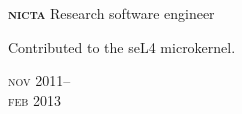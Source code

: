 
\begin{minipage}[t]{\mainboxwidth\textwidth}
\textbf{\textsc{nicta}}\phantom{..} Research software engineer\\
{\small 
Contributed to the seL4 microkernel.
\par}
\end{minipage}
\begin{minipage}[t]{\detailboxwidth\textwidth}
{
\hfill \textsc{nov} 2011--\\ 
\hspace*{0pt} \hfill \textsc{feb} 2013
\par
}
\end{minipage}







